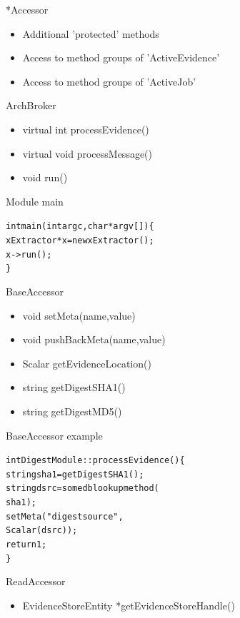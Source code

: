 \documentclass[pdf,contemporain,slideColor,colorBG,accumulate,nototal,capsules]{prosper}
\begin{document}
\begin{slide}{*Accessor}
\begin{itemize}
\item  Additional 'protected' methods
\item Access to method groups of 'ActiveEvidence'
\item Access to method groups of 'ActiveJob'
\end{itemize}
\end{slide}
\begin{slide}{ArchBroker}
\begin{itemize}
\item virtual int processEvidence()
\item virtual void processMessage()
\end{itemize}
\begin{itemize}
\item void run()
\end{itemize}
\end{slide}
\begin{slide}{Module main}
\begin{alltt}
int main(int argc,char *argv[])\{
  xExtractor *x=new xExtractor();
  x->run();
\}
\end{alltt}
\end{slide}
\begin{slide}{BaseAccessor}
\begin{itemize}
\item void setMeta(name,value)
\item void pushBackMeta(name,value)
\item Scalar getEvidenceLocation()
\item string getDigestSHA1()
\item string getDigestMD5()
\end{itemize}
\end{slide}
\begin{slide}{BaseAccessor example}
\begin{alltt}
int DigestModule::processEvidence() \{
  string sha1=getDigestSHA1();
  string dsrc=somedblookupmethod(
    sha1);
  setMeta("digestsource",
    Scalar(dsrc));
  return 1;
\}
\end{alltt}
\end{slide}
\begin{slide}{ReadAccessor}
\begin{itemize}
\item EvidenceStoreEntity *getEvidenceStoreHandle()
\end{itemize}
\end{slide}
\end{document}
